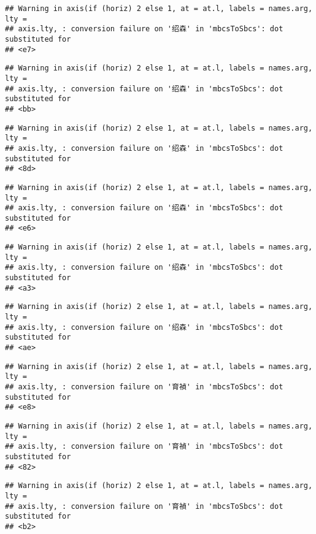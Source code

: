 \documentclass[
]{article}
\begin{document}
\begin{verbatim}
## Warning in axis(if (horiz) 2 else 1, at = at.l, labels = names.arg, lty =
## axis.lty, : conversion failure on '绍森' in 'mbcsToSbcs': dot substituted for
## <e7>
\end{verbatim}

\begin{verbatim}
## Warning in axis(if (horiz) 2 else 1, at = at.l, labels = names.arg, lty =
## axis.lty, : conversion failure on '绍森' in 'mbcsToSbcs': dot substituted for
## <bb>
\end{verbatim}

\begin{verbatim}
## Warning in axis(if (horiz) 2 else 1, at = at.l, labels = names.arg, lty =
## axis.lty, : conversion failure on '绍森' in 'mbcsToSbcs': dot substituted for
## <8d>
\end{verbatim}

\begin{verbatim}
## Warning in axis(if (horiz) 2 else 1, at = at.l, labels = names.arg, lty =
## axis.lty, : conversion failure on '绍森' in 'mbcsToSbcs': dot substituted for
## <e6>
\end{verbatim}

\begin{verbatim}
## Warning in axis(if (horiz) 2 else 1, at = at.l, labels = names.arg, lty =
## axis.lty, : conversion failure on '绍森' in 'mbcsToSbcs': dot substituted for
## <a3>
\end{verbatim}

\begin{verbatim}
## Warning in axis(if (horiz) 2 else 1, at = at.l, labels = names.arg, lty =
## axis.lty, : conversion failure on '绍森' in 'mbcsToSbcs': dot substituted for
## <ae>
\end{verbatim}

\begin{verbatim}
## Warning in axis(if (horiz) 2 else 1, at = at.l, labels = names.arg, lty =
## axis.lty, : conversion failure on '育禎' in 'mbcsToSbcs': dot substituted for
## <e8>
\end{verbatim}

\begin{verbatim}
## Warning in axis(if (horiz) 2 else 1, at = at.l, labels = names.arg, lty =
## axis.lty, : conversion failure on '育禎' in 'mbcsToSbcs': dot substituted for
## <82>
\end{verbatim}

\begin{verbatim}
## Warning in axis(if (horiz) 2 else 1, at = at.l, labels = names.arg, lty =
## axis.lty, : conversion failure on '育禎' in 'mbcsToSbcs': dot substituted for
## <b2>
\end{verbatim}
\end{document}
